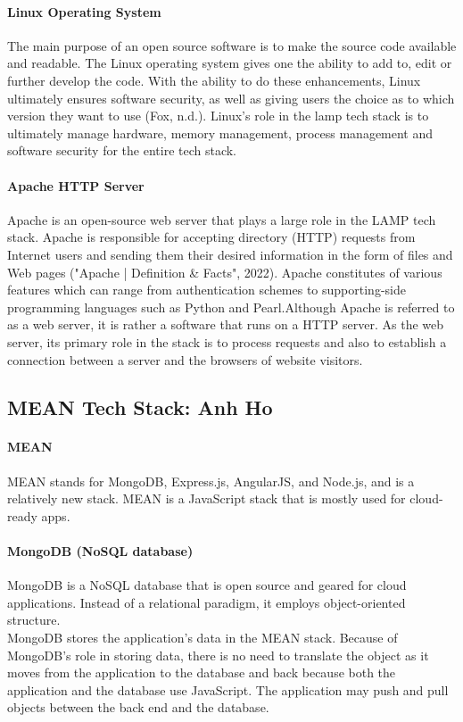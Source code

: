 \documentclass[a4paper, 11pt]{report}
\begin{document}
	\paragraph {Linux Operating System} The main purpose of an open source software is to make the source code available and readable. The Linux operating system gives one the ability to add to, edit or further develop the code. With the ability to do these enhancements, Linux ultimately ensures software security, as well as giving users the choice as to which version they want to use (Fox, n.d.). Linux’s role in the lamp tech stack is to ultimately manage hardware, memory management, process management and software security for the entire tech stack. 
	
	\paragraph {Apache HTTP Server} Apache is an open-source web server that plays a large role in the LAMP tech stack. Apache is responsible for accepting directory (HTTP) requests from Internet users and sending them their desired information in the form of files and Web pages ("Apache | Definition & Facts", 2022). Apache constitutes of various features which can range from authentication schemes to supporting-side programming languages such as Python and Pearl.Although Apache is referred to as a web server, it is rather a software that runs on a HTTP server. As the web server, its primary role in the stack is to process requests and also to establish a connection between a server and the browsers of website visitors. 
	
	
	
	\subsection{MEAN Tech Stack: Anh Ho}
	\paragraph{MEAN} MEAN stands for MongoDB, Express.js, AngularJS, and Node.js, and is a relatively new stack. MEAN is a JavaScript stack that is mostly used for cloud-ready apps.
	
	\paragraph{MongoDB (NoSQL database)} MongoDB is a NoSQL database that is open source and geared for cloud applications. Instead of a relational paradigm, it employs object-oriented structure.
	\\ MongoDB stores the application's data in the MEAN stack. Because of MongoDB’s role in storing data, there is no need to translate the object as it moves from the application to the database and back because both the application and the database use JavaScript. The application may push and pull objects between the back end and the database.
	
\end{document}
